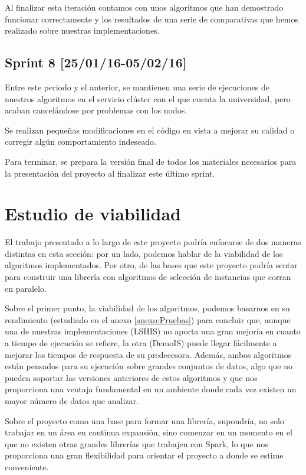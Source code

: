 Al finalizar esta iteración contamos con unos algoritmos que han demostrado funcionar correctamente y los resultados de una serie de comparativas que hemos realizado sobre nuestras implementaciones.

\subsection{Sprint 8 [25/01/16-05/02/16]}

Entre este periodo y el anterior, se mantienen una serie de ejecuciones de nuestros algoritmos en el servicio clúster con el que cuenta la universidad, pero acaban cancelándose por problemas con los nodos.

Se realizan pequeñas modificaciones en el código en vista a mejorar su calidad o corregir algún comportamiento indeseado.

Para terminar, se prepara la versión final de todos los materiales necesarios para la presentación del proyecto al finalizar este último sprint.


\section{Estudio de viabilidad}

El trabajo presentado a lo largo de este proyecto podría enfocarse de dos maneras distintas en esta sección: por un lado, podemos hablar de la viabilidad de los algoritmos implementados. Por otro, de las bases que este proyecto podría sentar para construir una librería con algoritmos de selección de instancias que corran en paralelo.

Sobre el primer punto, la viabilidad de los algoritmos, podemos basarnos en su rendimiento (estudiado en el anexo \ref{anexo:Pruebas}) para concluir que, aunque una de nuestras implementaciones (LSHIS) no aporta una gran mejoría en cuanto a tiempo de ejecución se refiere, la otra (DemoIS) puede llegar fácilmente a mejorar los tiempos de respuesta de su predecesora. Además, ambos algoritmos están pensados para su ejecución sobre grandes conjuntos de datos, algo que no pueden soportar las versiones anteriores de estos algoritmos y que nos proporciona una ventaja fundamental en un ambiente donde cada vez existen un mayor número de datos que analizar.

Sobre el proyecto como una base para formar una librería, supondría, no solo trabajar en un área en continua expansión, sino comenzar en un momento en el que no existen otras grandes librerías que trabajen con Spark, lo que nos proporciona una gran flexibilidad para orientar el proyecto a donde se estime conveniente.

